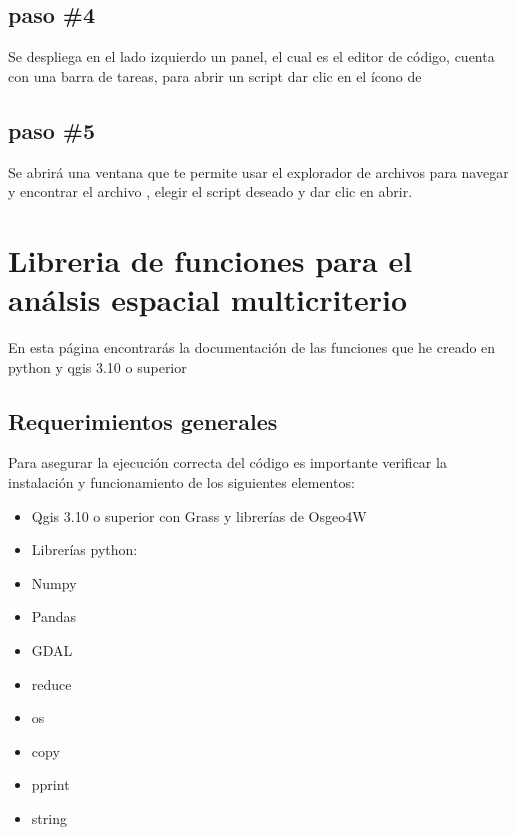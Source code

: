 \documentclass[letterpaper,10pt,spanish]{sphinxmanual}
\begin{document}
\noindent{}


\section{paso \#4}
\label{\detokenize{ejecucion:paso-4}}
Se despliega en el lado izquierdo un panel, el cual es el editor
de código, cuenta con una barra de tareas, para abrir un script
dar clic en el ícono de 

\noindent{}


\section{paso \#5}
\label{\detokenize{ejecucion:paso-5}}
Se abrirá una ventana que te permite usar el explorador de archivos
para navegar y encontrar el archivo , elegir el script deseado y
dar clic en abrir.

\noindent{}


\chapter{Libreria de funciones para el análsis espacial multicriterio}
\label{\detokenize{apcsig:libreria-de-funciones-para-el-analsis-espacial-multicriterio}}\label{\detokenize{apcsig::doc}}
En esta página encontrarás la documentación de las funciones que he creado en python y qgis 3.10 o superior


\section{Requerimientos generales}
\label{\detokenize{apcsig:requerimientos-generales}}
Para asegurar la ejecución correcta del código es importante
verificar la instalación y funcionamiento de los siguientes elementos:
\begin{itemize}
\item {} 
Qgis 3.10 o superior con Grass y librerías de Osgeo4W

\item {} 
Librerías python:

\end{itemize}
\begin{itemize}
\item {} 
Numpy

\item {} 
Pandas

\item {} 
GDAL

\item {} 
reduce

\item {} 
os

\item {} 
copy

\item {} 
pprint

\item {} 
string

\end{itemize}
\end{document}
